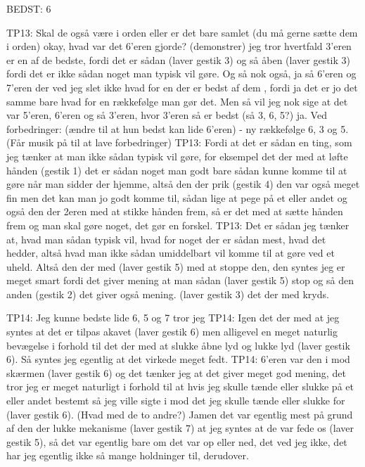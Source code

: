 BEDST: 6 

TP13: Skal de også være i orden eller er det bare samlet (du må gerne sætte dem i orden) okay, hvad var det 6’eren gjorde? (demonstrer) jeg tror hvertfald 3’eren er en af de bedste, fordi det er sådan (laver gestik 3) og så åben (laver gestik 3) fordi det er ikke sådan noget man typisk vil gøre. Og så nok også, ja så 6’eren og 7’eren der ved jeg slet ikke hvad for en der er bedst af dem , fordi ja det er jo det samme bare hvad for en rækkefølge man gør det. Men så vil jeg nok sige at det var 5’eren, 6’eren og så 3’eren, hvor 3’eren så er bedst (så 3, 6, 5?) ja.
Ved forbedringer: (ændre til at hun bedst kan lide 6’eren) - ny rækkefølge 6, 3 og 5. (Får musik på til at lave forbedringer)
TP13: Fordi at det er sådan en ting, som jeg tænker at man ikke sådan typisk vil gøre, for eksempel det der med at løfte hånden (gestik 1) det er sådan noget man godt bare sådan kunne komme til at gøre når man sidder der hjemme, altså den der prik (gestik 4) den var også meget fin men det kan man jo godt komme til, sådan lige at pege på et eller andet og også den der 2eren med at stikke hånden frem, så er det med at sætte hånden frem og man skal gøre noget, det gør en forskel. 
TP13: Det er sådan jeg tænker at, hvad man sådan typisk vil, hvad for noget der er sådan mest, hvad det hedder, altså hvad man ikke sådan umiddelbart vil komme til at gøre ved et uheld. Altså den der med (laver gestik 5) med at stoppe den, den syntes jeg er meget smart fordi det giver mening at man sådan (laver gestik 5) stop og så den anden (gestik 2) det giver også mening. (laver gestik 3) det der med kryds.


TP14: Jeg kunne bedste lide 6, 5 og 7 tror jeg
TP14: Igen det der med at jeg syntes at det er tilpas akavet (laver gestik 6) men alligevel en meget naturlig bevægelse i forhold til det der med at slukke åbne lyd og lukke lyd (laver gestik 6). Så syntes jeg egentlig at det virkede meget fedt. 
TP14: 6’eren var den i mod skærmen (laver gestik 6) og det tænker jeg at det giver meget god mening, det tror jeg er meget naturligt i forhold til at hvis jeg skulle tænde eller slukke på et eller andet bestemt så jeg ville sigte i mod det jeg skulle tænde eller slukke for (laver gestik 6). (Hvad med de to andre?) Jamen det var egentlig mest på grund af den der lukke mekanisme (laver gestik 7) at jeg syntes at de var fede os (laver gestik 5), så det var egentlig bare om det var op eller ned, det ved jeg ikke, det har jeg egentlig ikke så mange holdninger til, derudover.  





